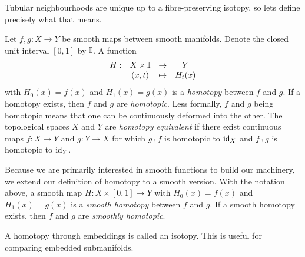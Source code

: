 Tubular neighbourhoods are unique up to a fibre-preserving isotopy, so lets define precisely what that means.

\begin{defn}[Homotopy]
	\label{def:homotopy}
	Let $f,g:X\to Y$ be smooth maps between smooth manifolds.
	Denote the closed unit interval $[0,1]$ by $\mathbb{I}$.
	A function 
	\[
		\begin{array}{cccc}
			H: & X\times \mathbb{I} & \to & Y \\
			   & (x,t)	& \mapsto & H_t(x)
		\end{array}
	\]
	with $H_0(x)=f(x)$ and $H_1(x)=g(x)$ is a \emph{homotopy} between $f$ and $g$.
	If a homotopy exists, then $f$ and $g$ are \emph{homotopic}.
	Less formally, $f$ and $g$ being homotopic means that one can be continuously deformed into the other.
	The topological spaces $X$ and $Y$ are \emph{homotopy equivalent} if there exist continuous maps $f:X\to Y$ and $g:Y\to X$ for which $g\comp f$ is homotopic to $\textrm{id}_{X}$ and $f\comp g$ is homotopic to $\textrm{id}_{Y}$.
	
	Because we are primarily interested in smooth functions to build our machinery, we extend our definition of homotopy to a smooth version.
	With the notation above, a smooth map $H:X\times[0,1]\to Y$ with $H_0(x)=f(x)$ and $H_1(x)=g(x)$ is a \emph{smooth homotopy} between $f$ and $g$.
	If a smooth homotopy exists, then $f$ and $g$ are \emph{smoothly homotopic}.
\end{defn}

A homotopy through embeddings is called an isotopy.
This is useful for comparing embedded submanifolds.

